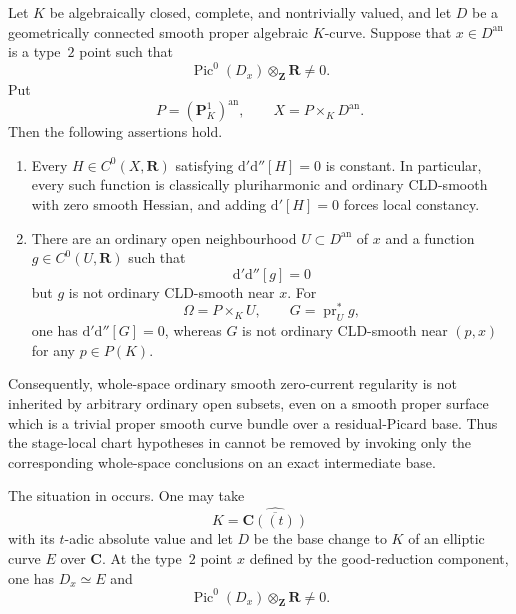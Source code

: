 \begin{proposition}
\label{prop:p213-zero-current-smoothness-not-open-hereditary}
Let $K$ be algebraically closed, complete, and nontrivially valued, and let
$D$ be a geometrically connected smooth proper algebraic $K$-curve.  Suppose
that $x\in D^{\mathrm{an}}$ is a type~$2$ point such that
\begin{equation}
\label{eq:p213-nonhereditary-residual-class}
 \operatorname{Pic}^0(D_x)\otimes_{\mathbf Z}\mathbf R\ne0.
\end{equation}
Put
\[
 P=(\mathbf P^1_K)^{\mathrm{an}},
 \qquad X=P\times_KD^{\mathrm{an}}.
\]
Then the following assertions hold.
\begin{enumerate}
\item Every $H\in C^0(X,\mathbf R)$ satisfying
$\mathrm d'\mathrm d''[H]=0$ is constant.  In particular, every such
function is classically pluriharmonic and ordinary CLD-smooth with zero
smooth Hessian, and adding $\mathrm d'[H]=0$ forces local constancy.
\item There are an ordinary open neighbourhood $U\subset D^{\mathrm{an}}$
of $x$ and a function $g\in C^0(U,\mathbf R)$ such that
\[
                     \mathrm d'\mathrm d''[g]=0
\]
but $g$ is not ordinary CLD-smooth near $x$.  For
\[
 \Omega=P\times_KU,
 \qquad G=\operatorname{pr}_U^*g,
\]
one has $\mathrm d'\mathrm d''[G]=0$, whereas $G$ is not ordinary
CLD-smooth near $(p,x)$ for any $p\in P(K)$.
\end{enumerate}
Consequently, whole-space ordinary smooth zero-current regularity is not
inherited by arbitrary ordinary open subsets, even on a smooth proper
surface which is a trivial proper smooth curve bundle over a
residual-Picard base.  Thus the stage-local chart hypotheses in
 cannot be removed
by invoking only the corresponding whole-space conclusions on an exact
intermediate base.
\end{proposition}

\begin{corollary}
\label{cor:p213-good-reduction-elliptic-open-nonheredity}
The situation in
 occurs.  One
may take
\[
                K=\widehat{\overline{\mathbf C((t))}}
\]
with its $t$-adic absolute value and let $D$ be the base change to $K$ of
an elliptic curve $E$ over $\mathbf C$.  At the type~$2$ point $x$
defined by the good-reduction component, one has $D_x\simeq E$ and
\[
 \operatorname{Pic}^0(D_x)\otimes_{\mathbf Z}\mathbf R\ne0.
\]
\end{corollary}
